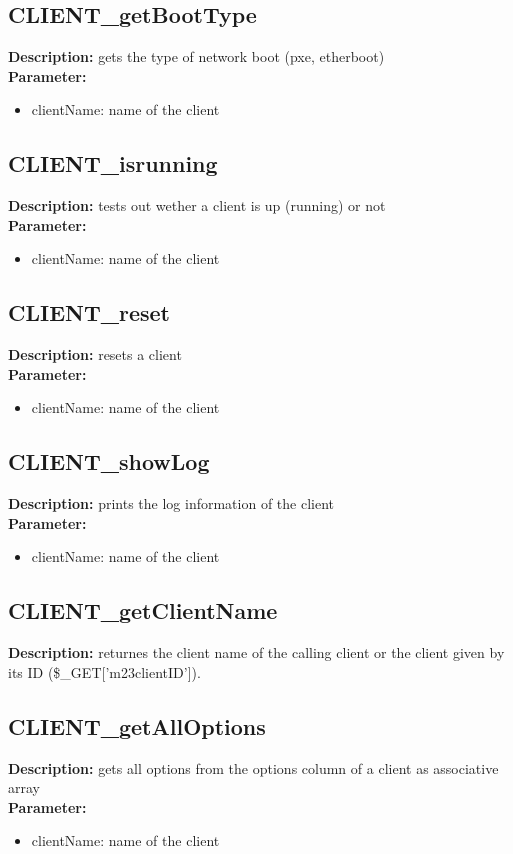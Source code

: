 \subsection{CLIENT\_getBootType}
\textbf{Description:} gets the type of network boot (pxe, etherboot)\\
\textbf{Parameter:}
\begin{itemize}
\item clientName: name of the client
\end{itemize}

\subsection{CLIENT\_isrunning}
\textbf{Description:} tests out wether a client is up (running) or not\\
\textbf{Parameter:}
\begin{itemize}
\item clientName: name of the client
\end{itemize}

\subsection{CLIENT\_reset}
\textbf{Description:} resets a client\\
\textbf{Parameter:}
\begin{itemize}
\item clientName: name of the client
\end{itemize}

\subsection{CLIENT\_showLog}
\textbf{Description:} prints the log information of the client\\
\textbf{Parameter:}
\begin{itemize}
\item clientName: name of the client
\end{itemize}

\subsection{CLIENT\_getClientName}
\textbf{Description:} returnes the client name of the calling client or the client given by its ID (\$\_GET['m23clientID']).\\

\subsection{CLIENT\_getAllOptions}
\textbf{Description:} gets all options from the options column of a client as associative array\\
\textbf{Parameter:}
\begin{itemize}
\item clientName: name of the client
\end{itemize}

